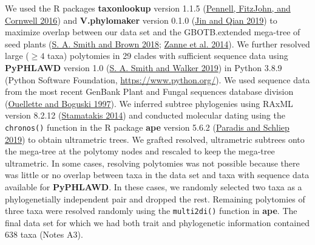 \documentclass[
  12pt,
]{article}
\begin{document}
We used the R packages \textbf{taxonlookup} version 1.1.5 (\protect\hyperlink{ref-pennell_simple_2016}{Pennell, FitzJohn, and Cornwell 2016}) and \textbf{V.phylomaker} version 0.1.0 (\protect\hyperlink{ref-jin_vphylomaker_2019}{Jin and Qian 2019}) to maximize overlap between our data set and the GBOTB.extended mega-tree of seed plants (\protect\hyperlink{ref-smith_constructing_2018}{S. A. Smith and Brown 2018}; \protect\hyperlink{ref-zanne_three_2014}{Zanne et al. 2014}). We further resolved large (\(\ge4\) taxa) polytomies in 29 clades with sufficient sequence data using \textbf{PyPHLAWD} version 1.0 (\protect\hyperlink{ref-smith_pyphlawd_2019}{S. A. Smith and Walker 2019}) in Python 3.8.9 (Python Software Foundation, \url{https://www.python.org/}). We used sequence data from the most recent GenBank Plant and Fungal sequences database division (\protect\hyperlink{ref-ouellette_database_1997}{Ouellette and Boguski 1997}). We inferred subtree phylogenies using RAxML version 8.2.12 (\protect\hyperlink{ref-stamatakis_raxml_2014}{Stamatakis 2014}) and conducted molecular dating using the \texttt{chronos()} function in the R package \textbf{ape} version 5.6.2 (\protect\hyperlink{ref-paradis_ape_2019}{Paradis and Schliep 2019}) to obtain ultrametric trees. We grafted resolved, ultrametric subtrees onto the mega-tree at the polytomy nodes and rescaled to keep the mega-tree ultrametric. In some cases, resolving polytomies was not possible because there was little or no overlap between taxa in the data set and taxa with sequence data available for \textbf{PyPHLAWD}. In these cases, we randomly selected two taxa as a phylogenetially independent pair and dropped the rest. Remaining polytomies of three taxa were resolved randomly using the \texttt{multi2di()} function in \textbf{ape}. The final data set for which we had both trait and phylogenetic information contained 638 taxa (Notes A3).

\clearpage
\end{document}

